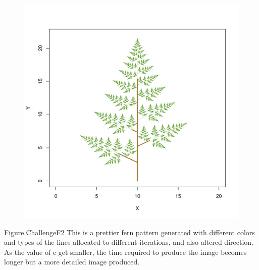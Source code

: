 \documentclass[12pt,a4paper]{article}
\begin{document}
\begin{figure}[t]
\centering
\includegraphics[width=\textwidth]{challengeF2.pdf}
\end{figure}
Figure.ChallengeF2 This is a prettier fern pattern generated with different colors and types of the lines allocated to different iterations, and also altered direction.
\\
As the value of e get smaller, the time required to produce the image becomes longer but a more detailed image produced.
\end{document}

